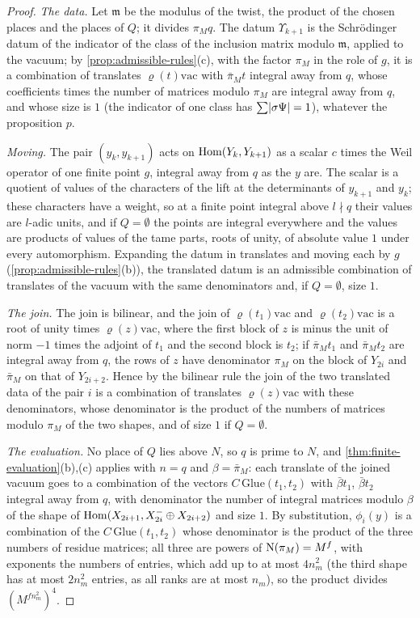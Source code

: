 \begin{proof}
\emph{The data.} Let $\mathfrak m$ be the modulus of the twist, the product of the chosen places and the places of $Q$; it divides $\pi_Mq$. The datum $\Upsilon_{k+1}$ is the Schr\"odinger datum of the indicator of the class of the inclusion matrix modulo $\mathfrak m$, applied to the vacuum; by
\cref{prop:admissible-rules}(c), with the factor $\pi_M$ in the role of $g$, it is a combination of translates $\varrho(t)\mathrm{vac}$ with $\bar\pi_Mt$ integral away from $q$, whose coefficients times the number of matrices modulo $\pi_M$ are integral away from $q$, and whose size is $1$ (the indicator of one class has $\sum\lvert \sigma\Psi\rvert=1$),
whatever the proposition $p$.

\emph{Moving.} The pair $(y_k,y_{k+1})$ acts on $\operatorname{Hom}(Y_k,Y_{k+1})$ as a scalar $c$ times the Weil operator of one finite point $g$, integral away from $q$ as the $y$ are. The scalar is a quotient of values of the characters of the lift at the determinants of $y_{k+1}$ and $y_k$; these characters have a weight, so at a finite point
integral above $l\nmid q$ their values are $l$-adic units, and if $Q=\emptyset$ the points are integral everywhere and the values are products of values of the tame parts, roots of unity, of absolute value $1$ under every automorphism. Expanding the datum in translates and moving each by $g$ (\cref{prop:admissible-rules}(b)), the translated datum
is an admissible combination of translates of the vacuum with the same denominators and, if $Q=\emptyset$, size $1$.

\emph{The join.} The join is bilinear, and the join of $\varrho(t_1)\mathrm{vac}$ and $\varrho(t_2)\mathrm{vac}$ is a root of unity times $\varrho(z)\mathrm{vac}$, where the first block of $z$ is minus the unit of norm $-1$ times the adjoint of $t_1$ and the second block is $t_2$; if $\bar\pi_Mt_1$ and $\bar\pi_Mt_2$ are integral away from $q$, the rows of $z$
have denominator $\pi_M$ on the block of $Y_{2i}$ and $\bar\pi_M$ on that of $Y_{2i+2}$. Hence by the bilinear rule the join of the two translated data of the pair $i$ is a combination of translates $\varrho(z)\mathrm{vac}$ with these denominators, whose denominator is the product of the numbers of matrices modulo $\pi_M$ of the two shapes, and of
size $1$ if $Q=\emptyset$.

\emph{The evaluation.} No place of $Q$ lies above $N$, so $q$ is prime to $N$, and \cref{thm:finite-evaluation}(b),(c) applies with $n=q$ and $\beta=\bar\pi_M$: each translate of the joined vacuum goes to a combination of the vectors $C\,\mathrm{Glue}(t_1,t_2)$ with $\bar\beta t_1$, $\bar\beta t_2$ integral away from $q$, with denominator the number of
integral matrices modulo $\beta$ of the shape of $\operatorname{Hom}(X_{2i+1},X_{2i}^-\oplus X_{2i+2})$ and size $1$. By substitution, $\phi_i(y)$ is a combination of the $C\,\mathrm{Glue}(t_1,t_2)$ whose denominator is the product of the three numbers of residue matrices; all three are powers of $\operatorname{N}(\pi_M)=M^f$, with exponents the numbers of entries, which add up to at
most $4n_m^2$ (the third shape has at most $2n_m^2$ entries, as all ranks are at most $n_m$), so the product divides $(M^{fn_m^2})^4$.


\end{proof}
